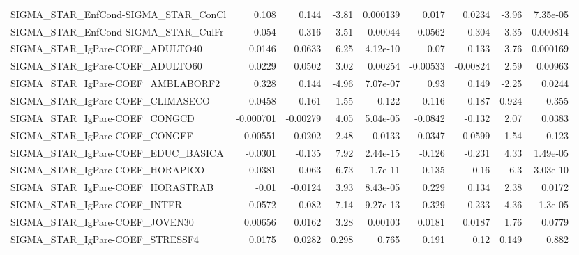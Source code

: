 \begin{tabular}{lrrrrrrrr}
SIGMA\_STAR\_EnfCond-SIGMA\_STAR\_ConCl   &       0.108 &        0.144 &    -3.81 & 0.000139 &      0.017 &      0.0234 &        -3.96 &      7.35e-05 \\
SIGMA\_STAR\_EnfCond-SIGMA\_STAR\_CulFr   &       0.054 &        0.316 &    -3.51 &  0.00044 &     0.0562 &       0.304 &        -3.35 &      0.000814 \\
SIGMA\_STAR\_IgPare-COEF\_ADULTO40       &      0.0146 &       0.0633 &     6.25 & 4.12e-10 &       0.07 &       0.133 &         3.76 &      0.000169 \\
SIGMA\_STAR\_IgPare-COEF\_ADULTO60       &      0.0229 &       0.0502 &     3.02 &  0.00254 &   -0.00533 &    -0.00824 &         2.59 &       0.00963 \\
SIGMA\_STAR\_IgPare-COEF\_AMBLABORF2     &       0.328 &        0.144 &    -4.96 & 7.07e-07 &       0.93 &       0.149 &        -2.25 &        0.0244 \\
SIGMA\_STAR\_IgPare-COEF\_CLIMASECO      &      0.0458 &        0.161 &     1.55 &    0.122 &      0.116 &       0.187 &        0.924 &         0.355 \\
SIGMA\_STAR\_IgPare-COEF\_CONGCD         &   -0.000701 &     -0.00279 &     4.05 & 5.04e-05 &    -0.0842 &      -0.132 &         2.07 &        0.0383 \\
SIGMA\_STAR\_IgPare-COEF\_CONGEF         &     0.00551 &       0.0202 &     2.48 &   0.0133 &     0.0347 &      0.0599 &         1.54 &         0.123 \\
SIGMA\_STAR\_IgPare-COEF\_EDUC\_BASICA    &     -0.0301 &       -0.135 &     7.92 & 2.44e-15 &     -0.126 &      -0.231 &         4.33 &      1.49e-05 \\
SIGMA\_STAR\_IgPare-COEF\_HORAPICO       &     -0.0381 &       -0.063 &     6.73 &  1.7e-11 &      0.135 &        0.16 &          6.3 &      3.03e-10 \\
SIGMA\_STAR\_IgPare-COEF\_HORASTRAB      &       -0.01 &      -0.0124 &     3.93 & 8.43e-05 &      0.229 &       0.134 &         2.38 &        0.0172 \\
SIGMA\_STAR\_IgPare-COEF\_INTER          &     -0.0572 &       -0.082 &     7.14 & 9.27e-13 &     -0.329 &      -0.233 &         4.36 &       1.3e-05 \\
SIGMA\_STAR\_IgPare-COEF\_JOVEN30        &     0.00656 &       0.0162 &     3.28 &  0.00103 &     0.0181 &      0.0187 &         1.76 &        0.0779 \\
SIGMA\_STAR\_IgPare-COEF\_STRESSF4       &      0.0175 &       0.0282 &    0.298 &    0.765 &      0.191 &        0.12 &        0.149 &         0.882 \\

\end{tabular}
